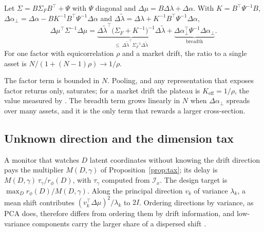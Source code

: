 \begin{corollary}\label{cor:factor}
Let $\Sigma=B\Sigma_FB^{\top}+\Psi$ with $\Psi$ diagonal and $\Delta\mu=B\Delta\lambda+\Delta\alpha$. With $K=B^{\top}\Psi^{-1}B$, $\Delta\alpha_\perp=\Delta\alpha-BK^{-1}B^{\top}\Psi^{-1}\Delta\alpha$ and $\Delta\tilde\lambda=\Delta\lambda+K^{-1}B^{\top}\Psi^{-1}\Delta\alpha$,
\begin{equation}\label{eq:factor}
\Delta\mu^{\top}\Sigma^{-1}\Delta\mu
=\underbrace{\Delta\tilde\lambda^{\top}\big(\Sigma_F+K^{-1}\big)^{-1}\Delta\tilde\lambda}_{\le\ \Delta\tilde\lambda^{\top}\Sigma_F^{-1}\Delta\tilde\lambda}
+\underbrace{\Delta\alpha_\perp^{\top}\Psi^{-1}\Delta\alpha_\perp}_{\text{breadth}} .
\end{equation}
For one factor with equicorrelation $\rho$ and a market drift, the ratio to a single asset is $N/(1+(N-1)\rho)\to1/\rho$.
\end{corollary}

The factor term is bounded in $N$. Pooling, and any representation that exposes factor returns only, saturates; for a market drift the plateau is $K_{\mathrm{eff}}=1/\rho$, the value measured by \citet{whitening_2026}. The breadth term grows linearly in $N$ when $\Delta\alpha_\perp$ spreads over many assets, and it is the only term that rewards a larger cross-section.

\subsection{Unknown direction and the dimension tax}\label{sec:tax}

A monitor that watches $D$ latent coordinates without knowing the drift direction pays the multiplier $M(D,\gamma)$ of Proposition~\ref{prop:tax}; its delay is $M(D,\gamma)\,\tau_\gamma/r_\phi(D)$, with $\tau_\gamma$ computed from $\mathcal{I}_x$. The design target is $\max_D r_\phi(D)/M(D,\gamma)$. Along the principal direction $v_k$ of variance $\lambda_k$, a mean shift contributes $(v_k^{\top}\Delta\mu)^2/\lambda_k$ to $2I$. Ordering directions by variance, as PCA does, therefore differs from ordering them by drift information, and low-variance components carry the larger share of a dispersed shift \citep{kuncheva_faithfull_2014,qahtan_2015}.


